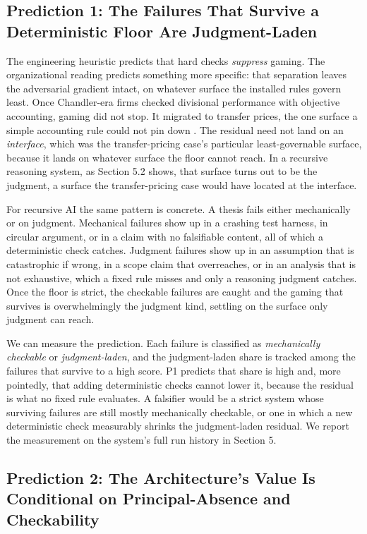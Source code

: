 \documentclass[11pt]{article}
\begin{document}
\subsection{Prediction 1: The Failures That Survive a Deterministic Floor Are Judgment-Laden}

The engineering heuristic predicts that hard checks \emph{suppress} gaming. The organizational reading predicts something more specific: that separation leaves the adversarial gradient intact, on whatever surface the installed rules govern least. Once Chandler-era firms checked divisional performance with objective accounting, gaming did not stop. It migrated to transfer prices, the one surface a simple accounting rule could not pin down \citep{eccles1985,williamson1985}. The residual need not land on an \emph{interface}, which was the transfer-pricing case's particular least-governable surface, because it lands on whatever surface the floor cannot reach. In a recursive reasoning system, as Section 5.2 shows, that surface turns out to be the judgment, a surface the transfer-pricing case would have located at the interface.

For recursive AI the same pattern is concrete. A thesis fails either mechanically or on judgment. Mechanical failures show up in a crashing test harness, in circular argument, or in a claim with no falsifiable content, all of which a deterministic check catches. Judgment failures show up in an assumption that is catastrophic if wrong, in a scope claim that overreaches, or in an analysis that is not exhaustive, which a fixed rule misses and only a reasoning judgment catches. Once the floor is strict, the checkable failures are caught and the gaming that survives is overwhelmingly the judgment kind, settling on the surface only judgment can reach.

We can measure the prediction. Each failure is classified as \emph{mechanically checkable} or \emph{judgment-laden}, and the judgment-laden share is tracked among the failures that survive to a high score. P1 predicts that share is high and, more pointedly, that adding deterministic checks cannot lower it, because the residual is what no fixed rule evaluates. A falsifier would be a strict system whose surviving failures are still mostly mechanically checkable, or one in which a new deterministic check measurably shrinks the judgment-laden residual. We report the measurement on the system's full run history in Section 5.

\subsection{Prediction 2: The Architecture's Value Is Conditional on Principal-Absence and Checkability}
\end{document}
